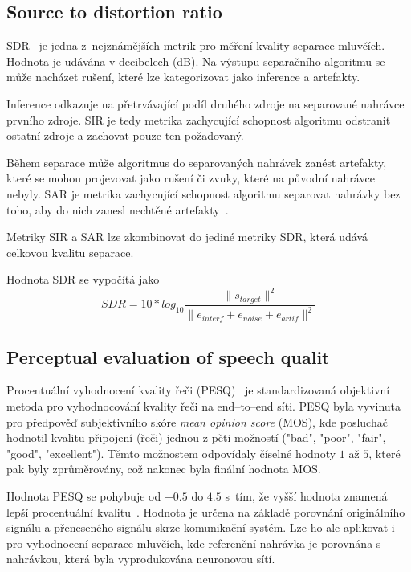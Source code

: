 \subsection{Source to distortion ratio}
SDR~\cite{vincent-inria-00544230} je jedna z~nejznámějších metrik pro měření kvality separace mluvčích. Hodnota je udávána v decibelech (dB). Na výstupu separačního algoritmu se může nacházet rušení, které lze kategorizovat jako inference a artefakty. 

Inference odkazuje na přetrvávající podíl druhého zdroje na separované nahrávce prvního zdroje. SIR je tedy metrika zachycující schopnost algoritmu odstranit ostatní zdroje a zachovat pouze ten požadovaný.

Během separace může algoritmus do separovaných nahrávek zanést artefakty, které se mohou projevovat jako rušení či zvuky, které na původní nahrávce nebyly. SAR je metrika zachycující schopnost algoritmu separovat nahrávky bez toho, aby do nich zanesl nechtěné artefakty~\cite{venkataramani2018performance}.

Metriky SIR a SAR lze zkombinovat do jediné metriky SDR, která udává celkovou kvalitu separace. 

Hodnota SDR se vypočítá jako 
\begin{equation}
  SDR = 10*log_{10}\frac{\|s_{target}\|^2}{\|e_{interf} + e_{noise} + e_{artif}\|^2}
\end{equation}




\subsection{Perceptual evaluation of speech qualit}
Procentuální vyhodnocení kvality řeči (PESQ)~\cite{pesq-itut} je standardizovaná objektivní metoda pro vyhodnocování kvality řeči na end--to--end síti. PESQ byla vyvinuta pro předpověď subjektivního skóre \textit{mean opinion score} (MOS), kde posluchač hodnotil kvalitu připojení (řeči) jednou z pěti možností ("bad", "poor", "fair", "good", "excellent"). Těmto možnostem odpovídaly číselné hodnoty $1$ až $5$, které pak byly zprůměrovány, což nakonec byla finální hodnota MOS.

Hodnota PESQ se pohybuje od $-0.5$ do $4.5$ s~tím, že vyšší hodnota znamená lepší procentuální kvalitu~\cite{sdr-pesq-optimization}. Hodnota je určena na základě porovnání originálního signálu a přeneseného signálu skrze komunikační systém. Lze ho ale aplikovat i pro vyhodnocení separace mluvčích, kde referenční nahrávka je porovnána s nahrávkou, která byla vyprodukována neuronovou sítí.

